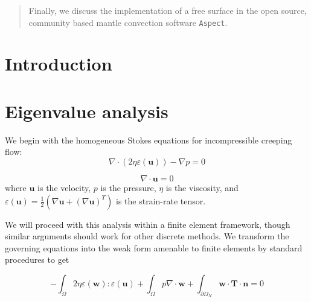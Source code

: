 \documentclass[preprint,12pt,authoryear]{elsarticle}
\begin{document}
\begin{frontmatter}
\begin{abstract}
Finally, we discuss the implementation of a free surface in the open source, community based
mantle convection software \texttt{Aspect}.
\end{abstract}

\begin{keyword}



\end{keyword}

\end{frontmatter}


\section{Introduction}
\label{sec:intro}

\section{Eigenvalue analysis}
\label{sec:eigenvalue}

We begin with the homogeneous Stokes equations for incompressible creeping flow:
\begin{equation}
\nabla \cdot \left( 2 \eta \varepsilon( \mathbf{u} ) \right) - \nabla p = 0
\label{eq:stokes}
\end{equation}

\begin{equation}
\nabla \cdot \mathbf{u} = 0
\label{eq:incompressible}
\end{equation}
where $\mathbf{u}$ is the velocity, $p$ is the pressure, $\eta$ is the viscosity, and 
$\varepsilon(\mathbf{u}) = \frac{1}{2}(\nabla \mathbf{u} + (\nabla \mathbf{u} )^T )$ is the strain-rate tensor.

We will proceed with this analysis within a finite element framework, though similar arguments should 
work for other discrete methods.
We transform the governing equations into the weak form amenable to finite elements by standard procedures \citep[e.g.][]{zienkiewicz1977finite} to get

\begin{equation}
-\int_\Omega 2 \eta \varepsilon( \mathbf{w} ) \colon \varepsilon( \mathbf{u} ) + \int_\Omega p \nabla \cdot \mathbf{w} 
+ \int_{\partial \Omega_N} \mathbf{w} \cdot \mathbf{T} \cdot \mathbf{n} = 0 
\label{eq:weak_stokes}
\end{equation}
\end{document}
